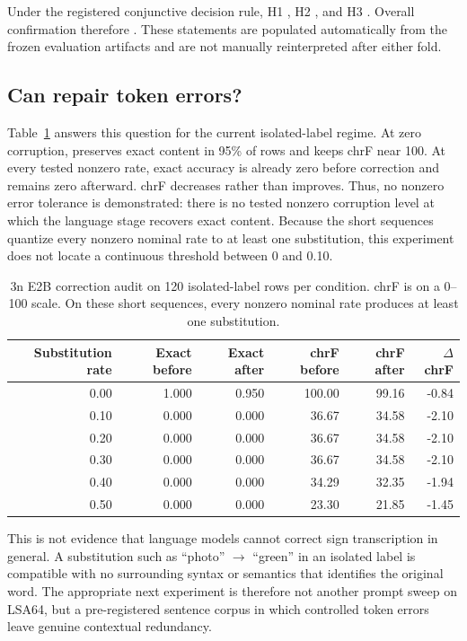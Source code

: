 Under the registered conjunctive decision rule, H1 \HOneOutcome, H2
\HTwoOutcome, and H3 \HThreeOutcome.  Overall confirmation therefore
\OverallOutcome.  These statements are populated automatically from the frozen
evaluation artifacts and are not manually reinterpreted after either fold.

\subsection{Can \Gemma{} repair token errors?}

Table~\ref{tab:gemma-tolerance} answers this question for the current isolated-label
regime.  At zero corruption, \Gemma{} preserves exact content in 95\% of rows and
keeps chrF near 100.  At every tested nonzero rate, exact accuracy is already zero
before correction and remains zero afterward.  chrF decreases rather than improves.
Thus, no nonzero error tolerance is demonstrated: there is no tested nonzero
corruption level at which the language stage recovers exact content.  Because the
short sequences quantize every nonzero nominal rate to at least one substitution,
this experiment does not locate a continuous threshold between 0 and 0.10.

\begin{table}[t]
\centering
\caption{\Gemma{} 3n E2B correction audit on 120 isolated-label rows per
condition.  chrF is on a 0--100 scale.  On these short sequences, every nonzero
nominal rate produces at least one substitution.}
\label{tab:gemma-tolerance}
\begin{tabular}{rrrrrr}
\toprule
Substitution rate & Exact before & Exact after & chrF before & chrF after & $\Delta$chrF \\
\midrule
0.00 & 1.000 & 0.950 & 100.00 & 99.16 & -0.84 \\
0.10 & 0.000 & 0.000 & 36.67 & 34.58 & -2.10 \\
0.20 & 0.000 & 0.000 & 36.67 & 34.58 & -2.10 \\
0.30 & 0.000 & 0.000 & 36.67 & 34.58 & -2.10 \\
0.40 & 0.000 & 0.000 & 34.29 & 32.35 & -1.94 \\
0.50 & 0.000 & 0.000 & 23.30 & 21.85 & -1.45 \\
\bottomrule
\end{tabular}
\end{table}

This is not evidence that language models cannot correct sign transcription in
general.  A substitution such as ``photo'' $\rightarrow$ ``green'' in an isolated
label is compatible with no surrounding syntax or semantics that identifies the
original word.  The appropriate next experiment is therefore not another prompt
sweep on LSA64, but a pre-registered sentence corpus in which controlled token
errors leave genuine contextual redundancy.
